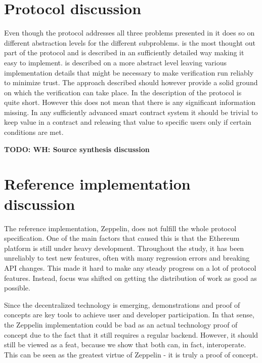 \section{Protocol discussion}
Even though the protocol addresses all three problems presented in  it does so on different abstraction levels for the different subproblems.  is the most thought out part of the protocol and is described in an sufficiently detailed way making it easy to implement.  is described on a more abstract level leaving various implementation details that might be necessary to make verification run reliably to minimize trust. The approach described should however provide a solid ground on which the verification can take place. In  the description of the protocol is quite short. However this does not mean that there is any significant information missing. In any sufficiently advanced smart contract system it should be trivial to keep value in a contract and releasing that value to specific users only if certain conditions are met.

\textbf{TODO: WH: Source synthesis discussion}

\section{Reference implementation discussion}
The reference implementation, Zeppelin, does not fulfill the whole protocol specification. One of the main factors that caused this is that the Ethereum platform is still under heavy development. Throughout the study, it has been unreliably to test new features, often with many regression errors and breaking API changes. This made it hard to make any steady progress on a lot of protocol features. Instead, focus was shifted on getting the distribution of work as good as possible.

Since the decentralized technology is emerging, demonstrations and proof of concepts are key tools to achieve user and developer participation. In that sense, the Zeppelin implementation could be bad as an actual technology proof of concept due to the fact that it still requires a regular backend. However, it should still be viewed as a feat, because we show that both can, in fact, interoperate. This can be seen as the greatest virtue of Zeppelin - it is truly a proof of concept.

